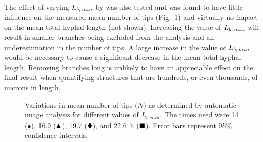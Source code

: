 The effect of varying $L_{b,\,min}$ by  was also tested and was found to have little influence on the measured mean number of tips (Fig.~\ref{fig:NtLbmin}) and virtually no impact on the mean total hyphal length (not shown). Increasing the value of $L_{b,\,min}$ will result in smaller branches being excluded from the analysis and an underestimation in the number of tips. A large increase in the value of $L_{b,\,min}$ would be necessary to cause a significant decrease in the mean total hyphal length. Removing branches  long is unlikely to have an appreciable effect on the final result when quantifying structures that are hundreds, or even thousands, of microns in length.

\begin{figure}[t]
	\centering
  \caption{Variations in mean number of tips ($N$) as determined by automatic image analysis for different values of $L_{b,min}$. The times used were 14 ($\bullet$), 16.9 ($\blacktriangle$), 19.7 ($\blacklozenge$), and 22.6~h ($\blacksquare$). Error bars represent 95\% confidence intervals.}
  \label{fig:NtLbmin}
\end{figure}